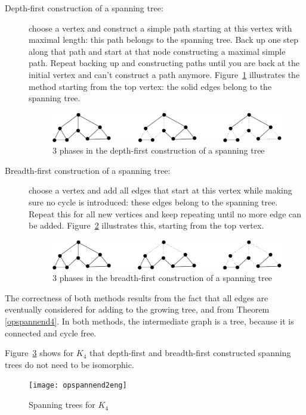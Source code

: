 \begin{description}
\item[Depth-first construction of a spanning tree:] choose a vertex
and construct a simple path starting at this vertex with maximal
length: this path belongs to the spanning tree. Back up one step along
that path and start at that node constructing a maximal simple path.
Repeat backing up and constructing paths until you are back at the
initial vertex and can't construct a path anymore.
Figure~\ref{diepteeerst1} illustrates the method starting from the top
vertex: the solid edges belong to the spanning tree.
\begin{figure}[ht]
	\centering
	\includegraphics[width=0.6\linewidth,keepaspectratio]{diepteeerst1}
	\caption{3 phases in the depth-first construction of a spanning
	tree \label{diepteeerst1}}
\end{figure}

\item[Breadth-first construction of a spanning tree:]
choose a vertex and add all edges that start at this vertex while making sure no
cycle is introduced: these edges belong to the spanning tree. Repeat this
for all new vertices and keep repeating until no more edge can be
added. Figure~\ref{breedteeerst1} illustrates this, starting from
the top vertex.

\begin{figure}[ht]
	\centering
	\includegraphics[width=0.6\linewidth,keepaspectratio]{breedteeerst1}
	\caption{3 phases in the breadth-first construction of a spanning tree \label{breedteeerst1}}
\end{figure}
\end{description}

The correctness of both methods results from the fact that all edges
are eventually considered for adding to the growing tree, and from
Theorem \ref{opspannend4}. In both methods, the intermediate graph is
a tree, because it is connected and cycle free.

Figure~\ref{opspannend2} shows for $K_{4}$ that depth-first and
breadth-first constructed spanning trees do not need to be isomorphic.

\begin{figure}[ht]
	\centering
	\texttt{[image: opspannend2eng]}
	\caption{Spanning trees for $K_{4}$\label{opspannend2}}
\end{figure}

